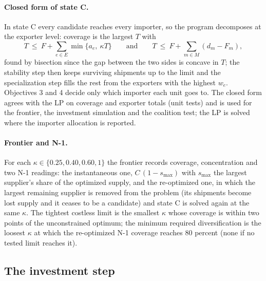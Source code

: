 \paragraph{Closed form of state C.} In state C every candidate reaches every importer, so the program
decomposes at the exporter level: coverage is the largest $T$ with
\begin{equation}\label{eq:aib_closed}
  T\ \le\ F+\sum_{e\in E}\min\{a_e,\ \kappa T\}\qquad\text{and}\qquad T\ \le\ F+\sum_{m\in M}(d_m-F_m),
\end{equation}
found by bisection since the gap between the two sides is concave in $T$; the stability step then
keeps surviving shipments up to the limit and the specialization step fills the rest from the
exporters with the highest $w_e$. Objectives 3 and 4 decide only which importer each unit goes to.
The closed form agrees with the LP on coverage and exporter totals (unit tests) and is used for the
frontier, the investment simulation and the coalition test; the LP is solved where the importer
allocation is reported.

\paragraph{Frontier and N-1.} For each $\kappa\in\{0.25,0.40,0.60,1\}$ the frontier records coverage,
concentration and two N-1 readings: the instantaneous one, $C\,(1-s_{\max})$ with $s_{\max}$ the largest
supplier's share of the optimized supply, and the re-optimized one, in which the largest remaining
supplier is removed from the problem (its shipments become lost supply and it ceases to be a candidate)
and state C is solved again at the same $\kappa$. The tightest costless limit is the smallest $\kappa$
whose coverage is within two points of the unconstrained optimum; the minimum required diversification
is the loosest $\kappa$ at which the re-optimized N-1 coverage reaches 80 percent (none if no tested
limit reaches it).

\subsection{The investment step}
\label{subsec:alg_investment}

